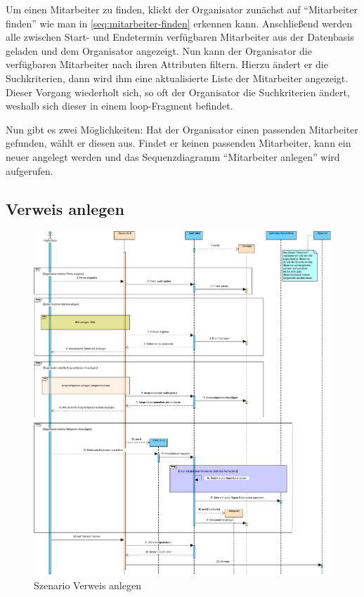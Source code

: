 Um einen Mitarbeiter zu finden, klickt der Organisator zunächst auf \enquote{Mitarbeiter finden} wie man in \autoref{seq:mitarbeiter-finden} erkennen kann. Anschließend werden alle zwischen Start- und Endetermin verfügbaren Mitarbeiter aus der Datenbasis geladen und dem Organisator angezeigt. Nun kann der Organisator die verfügbaren Mitarbeiter nach ihren Attributen filtern. Hierzu ändert er die Suchkriterien, dann wird ihm eine aktualisierte Liste der Mitarbeiter angezeigt. Dieser Vorgang wiederholt sich, so oft der Organisator die Suchkriterien ändert, weshalb sich dieser in einem loop-Fragment befindet.

Nun gibt es zwei Möglichkeiten: Hat der Organisator einen passenden Mitarbeiter gefunden, wählt er diesen aus. Findet er keinen passenden Mitarbeiter, kann ein neuer angelegt werden und das Sequenzdiagramm \enquote{Mitarbeiter anlegen} wird aufgerufen.

\FloatBarrier
\newpage

\subsection{Verweis anlegen}

\begin{figure}[ht!]
    \centering
    \includegraphics[width=0.98\columnwidth]{Bilder/seq_Verweis_anlegen.pdf}
    \caption{Szenario Verweis anlegen}
    \label{seq:verweis-anlegen}
\end{figure}

